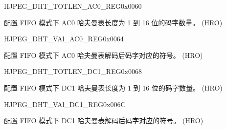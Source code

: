 \begin{register}{H}{JPEG\_DHT\_TOTLEN\_AC0\_REG}{0x0060}\label{regdesc:JPEGDHTTOTLENAC0REG}
%
\regnewline%
\begin{regdesc}\begin{reglist}
\label{fielddesc:JPEGDHTTOTLENAC0}\item [JPEG\_DHT\_TOTLEN\_AC0] 配置 FIFO 模式下 AC0 哈夫曼表长度为 1 到 16 位的码字数量。 (HRO)
\end{reglist}\end{regdesc}
\end{register}


\begin{register}{H}{JPEG\_DHT\_VAl\_AC0\_REG}{0x0064}\label{regdesc:JPEGDHTVALAC0REG}
%
\regnewline%
\begin{regdesc}\begin{reglist}
\label{fielddesc:JPEGDHTVALAC0}\item [JPEG\_DHT\_VAL\_AC0] 配置 FIFO 模式下 AC0 哈夫曼表解码后码字对应的符号。 (HRO)
\end{reglist}\end{regdesc}
\end{register}


\begin{register}{H}{JPEG\_DHT\_TOTLEN\_DC1\_REG}{0x0068}\label{regdesc:JPEGDHTTOTLENDC1REG}
%
\regnewline%
\begin{regdesc}\begin{reglist}
\label{fielddesc:JPEGDHTTOTLENDC1}\item [JPEG\_DHT\_TOTLEN\_DC1] 配置 FIFO 模式下 DC1 哈夫曼表长度为 1 到 16 位的码字数量。 (HRO)
\end{reglist}\end{regdesc}
\end{register}


\begin{register}{H}{JPEG\_DHT\_VAl\_DC1\_REG}{0x006C}\label{regdesc:JPEGDHTVALDC1REG}
%
\regnewline%
\begin{regdesc}\begin{reglist}
\label{fielddesc:JPEGDHTVALDC1}\item [JPEG\_DHT\_VAL\_DC1] 配置 FIFO 模式下 DC1 哈夫曼表解码后码字对应的符号。 (HRO)
\end{reglist}\end{regdesc}
\end{register}


